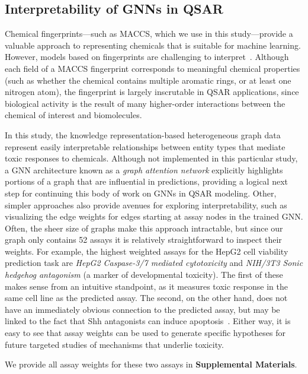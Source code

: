 \documentclass{ws-procs11x85}
\begin{document}
\subsection{Interpretability of GNNs in QSAR}
Chemical fingerprints---such as MACCS, which we use in this study---provide a valuable approach to representing chemicals that is suitable for machine learning.
However, models based on fingerprints are challenging to interpret~\cite{cherkasov2014qsar,matveieva2021benchmarks}.
Although each field of a MACCS fingerprint corresponds to meaningful chemical properties (such as whether the chemical contains multiple aromatic rings, or at least one nitrogen atom), the fingerprint is largely inscrutable in QSAR applications, since biological activity is the result of many higher-order interactions between the chemical of interest and biomolecules.

In this study, the knowledge representation-based heterogeneous graph data represent easily interpretable relationships between entity types that mediate toxic responses to chemicals.
Although not implemented in this particular study, a GNN architecture known as a \textit{graph attention network} explicitly highlights portions of a graph that are influential in predictions, providing a logical next step for continuing this body of work on GNNs in QSAR modeling.
Other, simpler approaches also provide avenues for exploring interpretability, such as visualizing the edge weights for edges starting at assay nodes in the trained GNN.
Often, the sheer size of graphs make this approach intractable, but since our graph only contains 52 assays it is relatively straightforward to inspect their weights.
For example, the highest weighted assays for the HepG2 cell viability prediction task are \textit{HepG2 Caspase-3/7 mediated cytotoxicity} and \textit{NIH/3T3 Sonic hedgehog antagonism} (a marker of developmental toxicity).
The first of these makes sense from an intuitive standpoint, as it measures toxic response in the same cell line as the predicted assay.
The second, on the other hand, does not have an immediately obvious connection to the predicted assay, but may be linked to the fact that Shh antagonists can induce apoptosis~\cite{wu2017smoothened}.
Either way, it is easy to see that assay weights can be used to generate specific hypotheses for future targeted studies of mechanisms that underlie toxicity.

We provide all assay weights for these two assays in \textbf{Supplemental Materials}.
\end{document}
